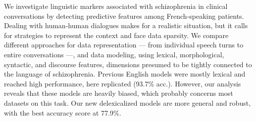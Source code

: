 We investigate linguistic markers associated with schizophrenia in clinical conversations by detecting predictive features among French-speaking patients. Dealing with human-human dialogues makes for a realistic situation, but it calls for strategies to represent the context and face data sparsity. We compare different approaches for data representation --- from individual speech turns to entire conversations ---, and data modeling, using lexical, morphological, syntactic, and discourse features, dimensions presumed to be tightly connected to the language of schizophrenia. Previous English models were mostly lexical and reached high performance, here replicated  (93.7\% acc.). However, our analysis reveals that these models are heavily biased, which probably concerns most datasets on this task. Our new delexicalized models are more general and robust, with the best accuracy score at 77.9\%.
